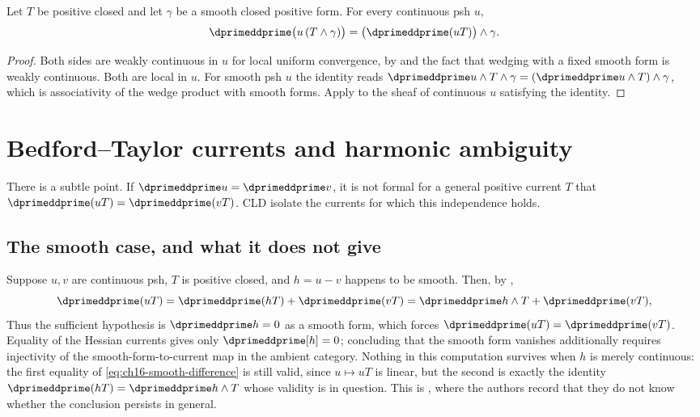 \begin{proposition}
\label{prop:ch16-smooth-factor}
Let $T$ be positive closed and let $\gamma$ be a smooth closed positive
form.  For every continuous psh $u$,
\[
 \dprimeddprime\bigl(u\,(T\wedge\gamma)\bigr)
 =\bigl(\dprimeddprime(uT)\bigr)\wedge\gamma .
\]
\end{proposition}

\begin{proof}
Both sides are weakly continuous in $u$ for local uniform convergence, by
 and the fact that wedging with
a fixed smooth form is weakly continuous.  Both are local in $u$.  For
smooth psh $u$ the identity reads
$\dprimeddprime u\wedge T\wedge\gamma
 =(\dprimeddprime u\wedge T)\wedge\gamma$, which is associativity of the
wedge product with smooth forms.  Apply
 to the sheaf of continuous $u$ satisfying
the identity.
\end{proof}

\section{Bedford--Taylor currents and harmonic ambiguity}
\label{sec:ch16-bt-currents}

There is a subtle point.  If $\dprimeddprime u=\dprimeddprime v$, it is not
formal for a general positive current $T$ that
$\dprimeddprime(uT)=\dprimeddprime(vT)$.  CLD isolate the currents for which
this independence holds.

\subsection{The smooth case, and what it does not give}
\label{sec:ch16-ambiguity-smooth}

Suppose $u,v$ are continuous psh, $T$ is positive closed, and
$h=u-v$ happens to be smooth.  Then, by
,
\begin{equation}
\label{eq:ch16-smooth-difference}
 \dprimeddprime(uT)=\dprimeddprime(hT)+\dprimeddprime(vT)
 =\dprimeddprime h\wedge T+\dprimeddprime(vT),
\end{equation}
Thus the sufficient hypothesis is $\dprimeddprime h=0$ as a smooth
form, which forces $\dprimeddprime(uT)=\dprimeddprime(vT)$.
Equality of the Hessian currents gives only $\dprimeddprime[h]=0$;
concluding that the smooth form vanishes additionally requires injectivity
of the smooth-form-to-current map in the ambient category.  Nothing in this computation
survives when $h$ is merely continuous: the first equality of
\eqref{eq:ch16-smooth-difference} is still valid, since $u\mapsto uT$ is
linear, but the second is exactly the identity
$\dprimeddprime(hT)=\dprimeddprime h\wedge T$ whose validity is in question.
This is \cite[\S8.6.1]{CLD25}, where the authors record that they do not
know whether the conclusion persists in general.

